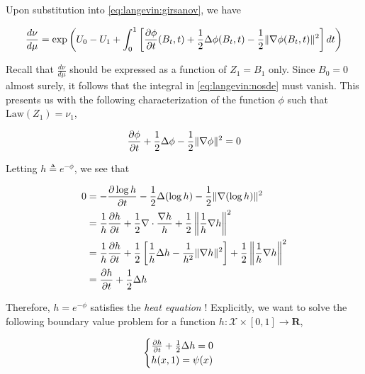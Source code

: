 Upon substitution into \eqref{eq:langevin:girsanov}, we have

\begin{equation}
  \label{eq:langevin:nosde}
  \frac{d\nu}{d\mu} = \exp\left(U_0 - U_1 +
    \int_0^1\left[\frac{\partial \phi}{\partial t}(B_t, t) +
      \frac{1}{2}\Delta\phi(B_t, t) -
      \frac{1}{2}\|\nabla\phi(B_t, t)\|^2\right]dt\right)
\end{equation}

Recall that $\frac{d\nu}{d\mu}$ should be expressed as a function of
$Z_1=B_1$ only. Since $B_0 = 0$ almost surely, it follows that the
integral in \eqref{eq:langevin:nosde} must vanish. This presents us
with the following characterization of the function $\phi$ such that
$\text{Law}(Z_1) = \nu_1$,

\begin{equation}
  \label{eq:langevin:pde}
  \frac{\partial \phi}{\partial t} + \frac{1}{2}\Delta\phi -
  \frac{1}{2}\|\nabla\phi\|^2 = 0
\end{equation}

Letting $h\triangleq e^{-\phi}$, we see that

\begin{align*}
  0 &= -\frac{\partial \log h}{\partial t} - \frac{1}{2}\Delta(\log h) -
  \frac{1}{2}\|\nabla(\log h)\|^2\\
  &= \frac{1}{h}\frac{\partial h}{\partial t} +
    \frac{1}{2}\nabla\cdot\frac{\nabla h}{h} +
    \frac{1}{2}\left\|\frac{1}{h}\nabla h\right\|^2\\
  &= \frac{1}{h}\frac{\partial h}{\partial t} +
    \frac{1}{2}\left[\frac{1}{h}\Delta h - \frac{1}{h^2}\|\nabla
    h\|^2\right] + \frac{1}{2}\left\|\frac{1}{h}\nabla h\right\|^2\\
  &= \frac{\partial h}{\partial t} + \frac{1}{2}\Delta h
\end{align*}

Therefore, $h = e^{-\phi}$ satisfies the \emph{heat equation}
\citep{harrison2013brownian, ullrich2011time}! Explicitly, we want to
solve the following boundary value problem for a function $h:\mathcal{X}\times[0,1]\to\mathbf{R}$,

\begin{equation}
  \label{eq:langevin:bvp}
  \begin{cases}
    \frac{\partial h}{\partial t} + \frac{1}{2}\Delta h = 0 \\
    h(x, 1) = \psi(x)\\
  \end{cases}
\end{equation}

